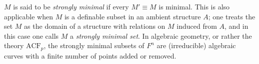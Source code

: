$M$ is said to be \emph{strongly minimal} if every $M' \equiv M$ is minimal. This is also applicable when $M$ is a definable subset in an ambient structure $A$; one treats the set $M$ as the domain of a structure with relations on $M$ induced from $A$, and in this case one calls $M$ a \emph{strongly minimal set}. In algebraic geometry, or rather the theory $\mathrm{ACF}_p$, the strongly minimal subsets of $F^n$ are (irreducible) algebraic curves with a finite number of points added or removed.
